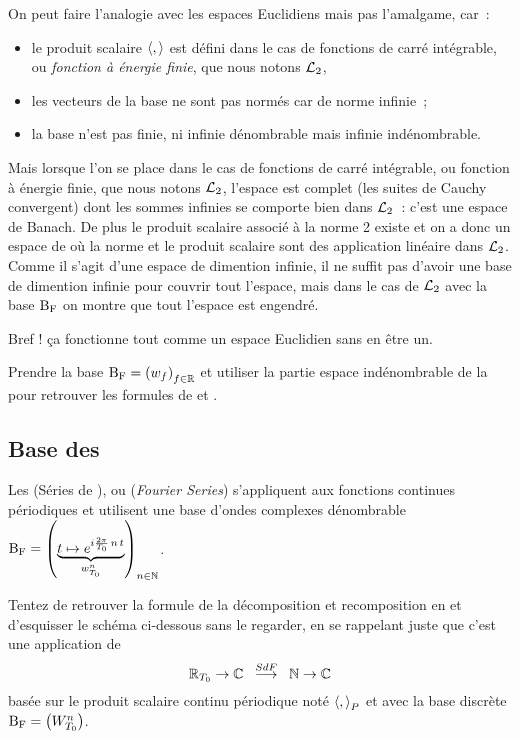  On peut faire
l'analogie avec les espaces Euclidiens mais pas l'amalgame, car~:
\begin{itemize}
\item le produit scalaire $\langle,\rangle$ est défini  dans le cas de fonctions de carré
intégrable, ou \emph{fonction à énergie finie}, que nous notons $\mathcal{L}_{2}$,
\item les vecteurs de la base ne sont pas normés car de norme infinie~;
\item la base n'est pas finie, ni infinie dénombrable mais infinie indénombrable.
\end{itemize}

Mais lorsque l'on se place dans le cas de fonctions de carré
intégrable, ou fonction à énergie finie, que nous notons $\mathcal{L}_{2}$,
l'espace est complet (les suites de Cauchy convergent) dont les sommes
infinies se comporte bien dans $\mathcal{L}_{2}$~: c'est une espace de
Banach. De plus le produit scalaire associé à la norme 2 existe et on
a donc un espace de \Hilbert{} où la norme et le produit scalaire sont
des application linéaire dans $\mathcal{L}_{2}$. Comme il s'agit d'une espace
de dimention infinie, il ne suffit pas d'avoir une base de dimention
infinie pour couvrir tout l'espace, mais dans le cas de $\mathcal{L}_{2}$ avec
la base $\mathrm{B_F}$ on montre que tout l'espace est engendré.

Bref ! ça fonctionne tout comme un espace Euclidien sans en être un.

\begin{exercice}
Prendre la base $\mathrm{B_F}=\left(w_f\right)_{f\in\mathbb{R}}$ et utiliser la partie espace indénombrable de la  pour retrouver les formules de \Plancherel{} et \Parseval{}. 
\end{exercice}


\subsection{Base des \sdf{}}
Les \sdf{} (Séries de \Fourier{}), ou \FS{} (\emph{Fourier Series}) s'appliquent aux fonctions continues périodiques et   utilisent une base d'ondes complexes dénombrable $\mathrm{B_F}=\left(\underbrace{t\mapsto e^{i \frac{2 \pi}{T_0}\,n\,t}}_{w_{T_0}^n}\right)_{n\in\mathbb{N}}$.
\begin{exercice}
Tentez de retrouver la formule de la décomposition et recomposition en \sdf{} et d'esquisser le schéma ci-dessous sans le regarder, en se rappelant juste que c'est une application de $$\RT0\rightarrow\C\;\;\operateur{\sdf}\;\;\N\rightarrow\C$$  basée sur le produit scalaire continu périodique noté $\langle,{\rangle}_P$ et avec la base discrète $\mathrm{B_F}=\left(W_{T_0}^n\right)$.
\end{exercice}

